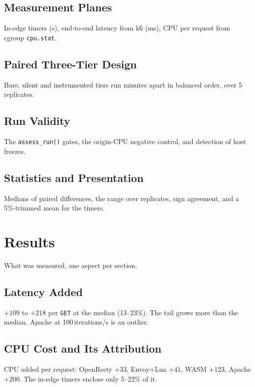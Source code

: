 \documentclass{rptuma}
\begin{document}
\section{Measurement Planes}
In-edge timers (\textmu s), end-to-end latency from k6 (ms), CPU per request from cgroup
\texttt{cpu.stat}.

\section{Paired Three-Tier Design}
Bare, silent and instrumented tiers run minutes apart in balanced order, over 5 replicates.

\section{Run Validity}
\label{sec:A.validity}
The \texttt{assess\_run()} gates, the origin-CPU negative control, and detection of host freezes.

\section{Statistics and Presentation}
Medians of paired differences, the range over replicates, sign agreement, and a 5\%-trimmed mean
for the timers.

\chapter{Results}
What was measured, one aspect per section.

\section{Latency Added}
$+109$ to $+218$\us{} per \texttt{GET} at the median (13--23\%). The tail grows more than the median.
Apache at 100\,iterations/s is an outlier.

\section{CPU Cost and Its Attribution}
CPU added per request: OpenResty $+33$, Envoy+Lua $+41$, WASM $+123$, Apache $+200$\us. The in-edge
timers enclose only 5--22\% of it.
\end{document}
